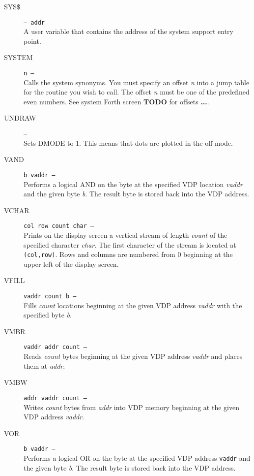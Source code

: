 \documentclass{article}
\begin{document}
\begin{multicols}{2}[]
\begin{description}
			\item[SYS\$]\texttt{--- addr }\\
				A user variable that contains the address of the system support entry point.

			\item[SYSTEM]\texttt{n --- }\\
				Calls the system synonyms. You must specify an offset \textit{n} into
				a jump table for the routine you wish to call. The offset \textit{n}
				must be one of the predefined even numbers. See system Forth screen 
				\textbf{TODO} for offsets \textbf{...}.

			\item[UNDRAW]\texttt{--- }\\
				Sets DMODE to 1. This means that dots are plotted in the off mode.

			\item[VAND]\texttt{b vaddr --- }\\
				Performs a logical AND on the byte at the specified VDP location
				\textit{vaddr} and the given byte \textit{b}. The result byte is
				stored back into the VDP address.

			\item[VCHAR]\texttt{col row count char --- }\\
				Prints on the display screen a vertical stream of length \textit{count}
				of the specified character \textit{char}. The first character of the
				stream is located at \verb|(col,row)|. Rows and columns are numbered
				from 0 beginning at the upper left of the display screen.

			\item[VFILL]\texttt{vaddr count b --- }\\
				Fills \textit{count} locations beginning at the given VDP address
				\textit{vaddr} with the specified byte \textit{b}.

			\item[VMBR]\texttt{vaddr addr count --- }\\
				Reads \textit{count} bytes beginning at the given VDP address
				\textit{vaddr} and places them at \textit{addr}.

			\item[VMBW]\texttt{addr vaddr count --- }\\
				Writes \textit{count} bytes from \textit{addr} into VDP memory
				beginning at the given VDP address \textit{vaddr}.

			\item[VOR]\texttt{b vaddr --- }\\
				Performs a logical OR on the byte at the specified VDP address
				\verb|vaddr| and the given byte \textit{b}. The result byte is stored
				back into the VDP address.


\end{description}
\end{multicols}
\end{document}
